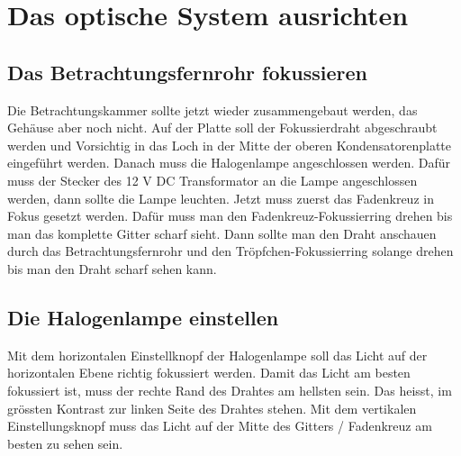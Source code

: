 \section{Das optische System ausrichten}\label{sec:optischesSystem}
\subsection{Das Betrachtungsfernrohr fokussieren}
Die Betrachtungskammer sollte jetzt wieder zusammengebaut werden, das Gehäuse aber noch nicht. Auf der Platte soll der Fokussierdraht abgeschraubt werden und Vorsichtig in das Loch in der Mitte der oberen Kondensatorenplatte eingeführt werden. Danach muss die Halogenlampe angeschlossen werden. Dafür muss der Stecker des 12 V DC Transformator an die Lampe angeschlossen werden, dann sollte die Lampe leuchten. Jetzt muss zuerst das Fadenkreuz in Fokus gesetzt werden. Dafür muss man den Fadenkreuz-Fokussierring drehen bis man das komplette Gitter scharf sieht. Dann sollte man den Draht anschauen durch das Betrachtungsfernrohr und den Tröpfchen-Fokussierring solange drehen bis man den Draht scharf sehen kann. 

\subsection{Die Halogenlampe einstellen}\label{sub:Halogenlampe}
Mit dem horizontalen Einstellknopf der Halogenlampe soll das Licht auf der horizontalen Ebene richtig fokussiert werden. Damit das Licht am besten fokussiert ist, muss der rechte Rand des Drahtes am hellsten sein. Das heisst, im grössten Kontrast zur linken Seite des Drahtes stehen. Mit dem vertikalen Einstellungsknopf muss das Licht auf der Mitte des Gitters / Fadenkreuz am besten zu sehen sein.